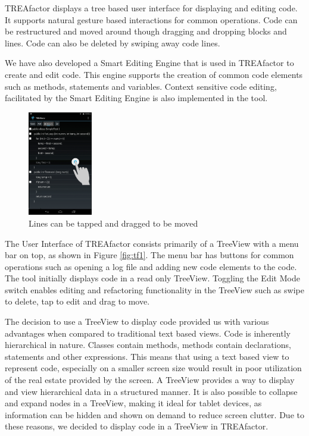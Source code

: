 \documentclass[10.5pt,twocolumn]{article}
\begin{document}
TREAfactor displays a tree based user interface for displaying and editing code. It supports natural gesture based interactions for common operations. Code can be restructured and moved around though dragging and dropping blocks and lines. Code can also be deleted by swiping away code lines.

We have also developed a Smart Editing Engine that is used in TREAfactor to create and edit code. This engine supports the creation of common code elements such as methods, statements and variables. Context sensitive code editing, facilitated by the Smart Editing Engine is also implemented in the tool.


\begin{figure}[h]
    \centering
    \includegraphics[width=0.25\textwidth]{taptomove}
    \caption{Lines can be tapped and dragged to be moved}
    \label{fig:tf6}
\end{figure}

The User Interface of TREAfactor consists primarily of a TreeView with a menu bar on top, as shown in Figure \ref{fig:tf1}. The menu bar has buttons for common operations such as opening a log file and adding new code elements to the code. The tool initially displays code in a read only TreeView. Toggling the Edit Mode switch enables editing and refactoring functionality in the TreeView such as swipe to delete, tap to edit and drag to move.

The decision to use a TreeView to display code provided us with various advantages when compared to traditional text based views. Code is inherently hierarchical in nature. Classes contain methods, methods contain declarations, statements and other expressions. This means that using a text based view to represent code, especially on a smaller screen size would result in poor utilization of the real estate provided by the screen. A TreeView provides a way to display and view hierarchical data in a structured manner. It is also possible to collapse and expand nodes in a TreeView, making it ideal for tablet devices, as information can be hidden and shown on demand to reduce screen clutter. Due to these reasons, we decided to display code in a TreeView in TREAfactor.
\end{document}
